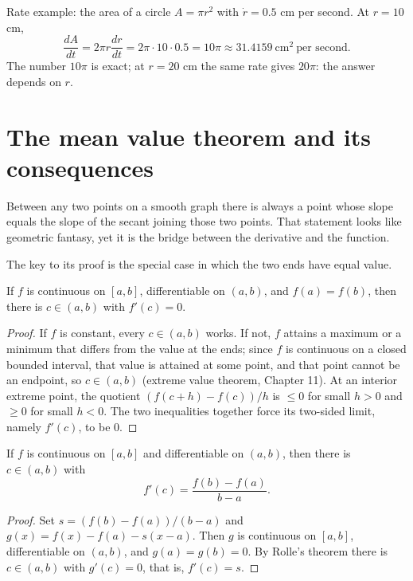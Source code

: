 Rate example: the area of a circle $A=\pi r^{2}$ with $\dot r=0.5$ cm per second. At
$r=10$ cm,
\[
  \frac{dA}{dt}=2\pi r\frac{dr}{dt}=2\pi\cdot10\cdot0.5=10\pi\approx31.4159
  \ \text{cm}^{2}\ \text{per second}.
\]
The number $10\pi$ is exact; at $r=20$ cm the same rate gives $20\pi$: the answer depends on
$r$.

\section{The mean value theorem and its consequences}

Between any two points on a smooth graph there is always a point whose slope equals the slope
of the secant joining those two points. That statement looks like geometric fantasy, yet it is
the bridge between the derivative and the function.

The key to its proof is the special case in which the two ends have equal value.

\begin{teorema}[Rolle]
If $f$ is continuous on $[a,b]$, differentiable on $(a,b)$, and $f(a)=f(b)$, then there is
$c\in(a,b)$ with $f'(c)=0$.
\end{teorema}

\begin{proof}
If $f$ is constant, every $c\in(a,b)$ works. If not, $f$ attains a maximum or a minimum that
differs from the value at the ends; since $f$ is continuous on a closed bounded interval,
that value is attained at some point, and that point cannot be an endpoint, so $c\in(a,b)$
(extreme value theorem, Chapter 11). At an interior extreme point, the quotient
$(f(c+h)-f(c))/h$ is $\le0$ for small $h>0$ and $\ge0$ for small $h<0$. The two inequalities
together force its two-sided limit, namely $f'(c)$, to be $0$.
\end{proof}

\begin{teorema}
If $f$ is continuous on $[a,b]$ and differentiable on $(a,b)$, then there is $c\in(a,b)$
with
\[
  f'(c)=\frac{f(b)-f(a)}{b-a}.
\]
\end{teorema}

\begin{proof}
Set $s=(f(b)-f(a))/(b-a)$ and $g(x)=f(x)-f(a)-s(x-a)$. Then $g$ is continuous on $[a,b]$,
differentiable on $(a,b)$, and $g(a)=g(b)=0$. By Rolle's theorem there is $c\in(a,b)$ with
$g'(c)=0$, that is, $f'(c)=s$.
\end{proof}

